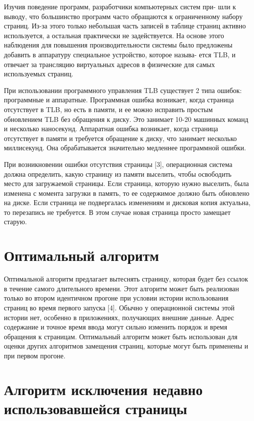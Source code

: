 Изучив поведение программ, разработчики компьютерных систем при-
шли к выводу, что большинство программ часто обращаются к ограниченному
набору страниц. Из-за этого только небольшая часть записей в таблице страниц активно используется, а остальная практически не задействуется. На
основе этого наблюдения для повышения производительности системы было
предложены добавить в аппаратуру специальное устройство, которое называ-
ется TLB, и отвечает за трансляцию виртуальных адресов в физические для
самых используемых страниц.

При использовании программного управления TLB существует 2 типа
ошибок: программные и аппаратные. Программная ошибка возникает, когда
страница отсутствует в TLB, но есть в памяти, и ее можно исправить простым
обновлением TLB без обращения к диску. Это занимает 10-20 машинных команд и несколько наносекунд. Аппаратная ошибка возникает, когда страница
отсутствует в памяти и требуется обращение к диску, что занимает несколько миллисекунд. Она обрабатывается значительно медленнее программной
ошибки.

При возникновении ошибки отсутствия страницы [3], операционная
система должна определить, какую страницу из памяти выселить, чтобы
освободить место для загружаемой страницы. Если страница, которую нужно
выселить, была изменена с момента загрузки в память, то ее содержимое
должно быть обновлено на диске. Если страница не подвергалась изменениям
и дисковая копия актуальна, то перезапись не требуется. В этом случае новая
страница просто замещает старую.

\section{Оптимальный алгоритм}

Оптимальной алгоритм предлагает вытеснять страницу, которая будет
без ссылок в течение самого длительного времени. Этот алгоритм может
быть реализован только во втором идентичном прогоне при условии истории
использования страниц во время первого запуска [4]. Обычно у операционной
системы этой истории нет, особенно в приложениях, получающих внешние
данные. Адрес содержание и точное время ввода могут сильно изменить
порядок и время обращения к страницам. Оптимальный алгоритм может
быть использован для оценки других алгоритмов замещения страниц, которые
могут быть применены и при первом прогоне.

\section{Алгоритм исключения недавно использовавшейся страницы}

